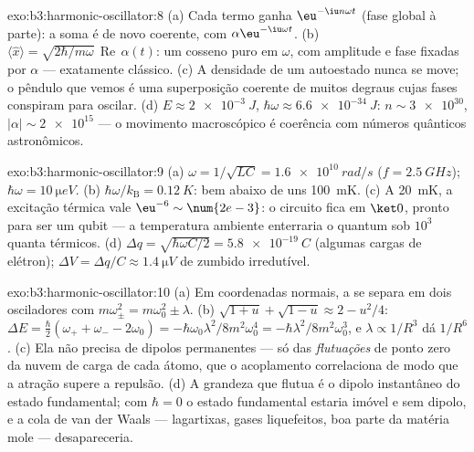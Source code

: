 \begin{solution}{exo:b3:harmonic-oscillator:8}
(a) Cada termo ganha $\eu^{-\iu n\omega t}$ (fase global à parte): a
soma é de novo coerente, com $\alpha\eu^{-\iu\omega t}$. (b)
$\langle\hat x\rangle = \sqrt{2\hbar/m\omega}\,
\operatorname{Re}\,\alpha(t)$: um cosseno puro em $\omega$, com
amplitude e fase fixadas por $\alpha$ --- exatamente clássico. (c) A
densidade de um autoestado nunca se move; o pêndulo que vemos é uma
superposição coerente de muitos degraus cujas fases conspiram para
oscilar. (d) $E
\approx \qty{2e-3}{J}$, $\hbar\omega \approx \qty{6.6e-34}{J}$: $n
\sim \num{3e30}$, $|\alpha| \sim \num{2e15}$ --- o movimento
macroscópico é coerência com números quânticos astronômicos.
\end{solution}

\begin{solution}{exo:b3:harmonic-oscillator:9}
(a) $\omega = 1/\sqrt{LC} = \qty{1.6e10}{rad/s}$ ($f =
\qty{2.5}{GHz}$); $\hbar\omega = \qty{10}{\micro eV}$. (b)
$\hbar\omega/k_{\text{B}} = \qty{0.12}{K}$: bem abaixo de uns
\qty{100}{mK}. (c) A \qty{20}{mK}, a excitação térmica vale
$\eu^{-6} \sim \num{2e-3}$: o circuito fica em $\ket0$, pronto para
ser um qubit --- a temperatura ambiente enterraria o quantum sob $10^3$
quanta térmicos. (d) $\Delta q = \sqrt{\hbar\omega C/2} =
\qty{5.8e-19}{C}$ (algumas cargas de elétron); $\Delta V = \Delta q/C
\approx \qty{1.4}{\micro V}$ de zumbido irredutível.
\end{solution}

\begin{solution}{exo:b3:harmonic-oscillator:10}
(a) Em coordenadas normais, a  se separa em dois
osciladores com $m\omega_\pm^2 = m\omega_0^2 \pm \lambda$. (b)
$\sqrt{1 + u} + \sqrt{1 - u} \approx 2 - u^2/4$: $\Delta E =
\tfrac\hbar2(\omega_+ + \omega_- - 2\omega_0) =
-\hbar\omega_0\lambda^2/8m^2\omega_0^4 =
-\hbar\lambda^2/8m^2\omega_0^3$, e $\lambda \propto 1/R^3$ dá
$1/R^6$. (c) Ela não precisa de dipolos permanentes --- só das
\emph{flutuações} de ponto zero da nuvem de carga de cada átomo, que o
acoplamento correlaciona de modo que a atração supere a repulsão. (d) A
grandeza que flutua é o dipolo instantâneo do estado fundamental; com
$\hbar = 0$ o estado fundamental estaria imóvel e sem dipolo, e a cola
de van der Waals --- lagartixas, gases liquefeitos, boa parte da
matéria mole --- desapareceria.
\end{solution}

